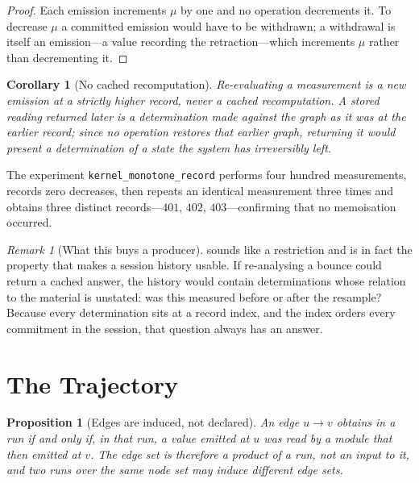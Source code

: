 \documentclass[11pt,twocolumn,a4paper]{article}
\newtheorem{corollary}[theorem]{Corollary}
\newtheorem{proposition}[theorem]{Proposition}
\theoremstyle{definition}
\theoremstyle{remark}
\newtheorem{remark}[theorem]{Remark}
\newcommand{\rec}{\mu}
\begin{document}
\begin{proof}
Each emission increments $\rec$ by one and no operation decrements it. To
decrease $\rec$ a committed emission would have to be withdrawn; a withdrawal is
itself an emission---a value recording the retraction---which increments $\rec$
rather than decrementing it.
\end{proof}

\begin{corollary}[No cached recomputation]
\label{cor:no-cache}
Re-evaluating a measurement is a new emission at a strictly higher record, never
a cached recomputation. A stored reading returned later is a determination made
against the graph \emph{as it was} at the earlier record; since no operation
restores that earlier graph, returning it would present a determination of a
state the system has irreversibly left.
\end{corollary}

The experiment \texttt{kernel\_monotone\_record} performs four hundred
measurements, records zero decreases, then repeats an identical measurement three
times and obtains three distinct records---$401$, $402$, $403$---confirming that
no memoisation occurred.

\begin{remark}[What this buys a producer]
\label{rem:record-producer}
 sounds like a restriction and is in fact the property that
makes a session history usable. If re-analysing a bounce could return a cached
answer, the history would contain determinations whose relation to the material
is unstated: was this measured before or after the resample? Because every
determination sits at a record index, and the index orders every commitment in the
session, that question always has an answer.
\end{remark}

\section{The Trajectory}
\label{sec:trajectory}

\begin{proposition}[Edges are induced, not declared]
\label{prop:edges}
An edge $u\to v$ obtains in a run if and only if, in that run, a value emitted at
$u$ was read by a module that then emitted at $v$. The edge set is therefore a
product of a run, not an input to it, and two runs over the same node set may
induce different edge sets.
\end{proposition}
\end{document}
